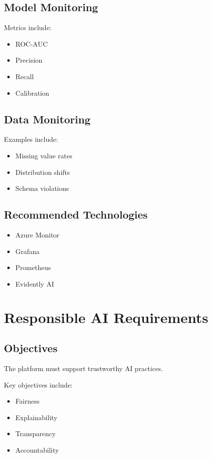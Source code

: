 \subsection{Model Monitoring}

Metrics include:

\begin{itemize}
    \item ROC-AUC
    \item Precision
    \item Recall
    \item Calibration
\end{itemize}

\subsection{Data Monitoring}

Examples include:

\begin{itemize}
    \item Missing value rates
    \item Distribution shifts
    \item Schema violations
\end{itemize}

\subsection{Recommended Technologies}

\begin{itemize}
    \item Azure Monitor
    \item Grafana
    \item Prometheus
    \item Evidently AI
\end{itemize}

\section{Responsible AI Requirements}

\subsection{Objectives}

The platform must support trustworthy AI practices.

Key objectives include:

\begin{itemize}
    \item Fairness
    \item Explainability
    \item Transparency
    \item Accountability
\end{itemize}


